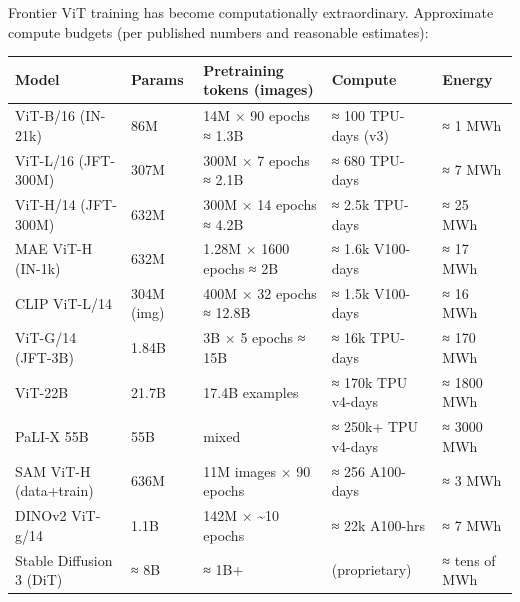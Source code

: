 Frontier ViT training has become computationally extraordinary. Approximate compute budgets (per published numbers and reasonable estimates):

{\def\LTcaptype{none} %
\begin{longtable}[]{@{}
  >{\raggedright\arraybackslash}p{}
  >{\raggedright\arraybackslash}p{}
  >{\raggedright\arraybackslash}p{}
  >{\raggedright\arraybackslash}p{}
  >{\raggedright\arraybackslash}p{}@{}}
\toprule\noalign{}
\begin{minipage}[b]{\linewidth}\raggedright
Model
\end{minipage} & \begin{minipage}[b]{\linewidth}\raggedright
Params
\end{minipage} & \begin{minipage}[b]{\linewidth}\raggedright
Pretraining tokens (images)
\end{minipage} & \begin{minipage}[b]{\linewidth}\raggedright
Compute
\end{minipage} & \begin{minipage}[b]{\linewidth}\raggedright
Energy
\end{minipage} \\
\midrule\noalign{}
\endhead
\bottomrule\noalign{}
\endlastfoot
ViT-B/16 (IN-21k) & 86M & 14M × 90 epochs ≈ 1.3B & ≈ 100 TPU-days (v3) & ≈ 1 MWh \\
ViT-L/16 (JFT-300M) & 307M & 300M × 7 epochs ≈ 2.1B & ≈ 680 TPU-days & ≈ 7 MWh \\
ViT-H/14 (JFT-300M) & 632M & 300M × 14 epochs ≈ 4.2B & ≈ 2.5k TPU-days & ≈ 25 MWh \\
MAE ViT-H (IN-1k) & 632M & 1.28M × 1600 epochs ≈ 2B & ≈ 1.6k V100-days & ≈ 17 MWh \\
CLIP ViT-L/14 & 304M (img) & 400M × 32 epochs ≈ 12.8B & ≈ 1.5k V100-days & ≈ 16 MWh \\
ViT-G/14 (JFT-3B) & 1.84B & 3B × 5 epochs ≈ 15B & ≈ 16k TPU-days & ≈ 170 MWh \\
ViT-22B & 21.7B & 17.4B examples & ≈ 170k TPU v4-days & ≈ 1800 MWh \\
PaLI-X 55B & 55B & mixed & ≈ 250k+ TPU v4-days & ≈ 3000 MWh \\
SAM ViT-H (data+train) & 636M & 11M images × 90 epochs & ≈ 256 A100-days & ≈ 3 MWh \\
DINOv2 ViT-g/14 & 1.1B & 142M × \textasciitilde10 epochs & ≈ 22k A100-hrs & ≈ 7 MWh \\
Stable Diffusion 3 (DiT) & ≈ 8B & ≈ 1B+ & (proprietary) & ≈ tens of MWh \\
\end{longtable}
}


